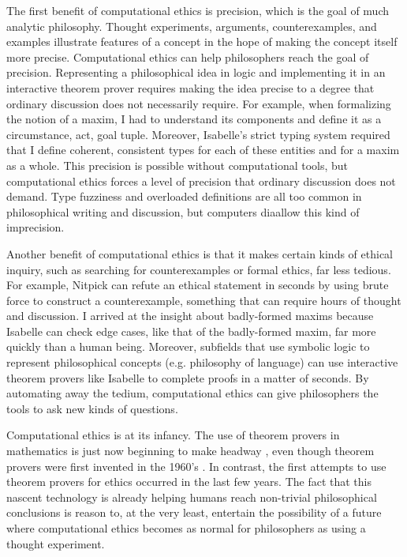 \begin{isabellebody}
\begin{isamarkuptext}
The first benefit of computational ethics is precision, which is the goal of much analytic
philosophy. Thought experiments, arguments, counterexamples, and examples 
illustrate features of a concept in the hope of making the concept itself more precise. Computational 
ethics can help philosophers reach the goal of precision. Representing a philosophical idea in logic 
and implementing it in an interactive theorem prover requires making the idea precise to a degree 
that ordinary discussion does not necessarily require. For example, when formalizing the notion of a 
maxim, I had to understand its components and define it as a circumstance, act, goal tuple. Moreover, 
Isabelle's strict typing system required that I define coherent, consistent types for each of these 
entities and for a maxim as a whole. This precision is possible without computational tools, but 
computational ethics forces a level of precision that ordinary discussion does not demand. Type 
fuzziness and overloaded definitions are all too common in philosophical writing and 
discussion, but computers diaallow this kind of imprecision.

Another benefit of computational ethics is that it makes certain kinds of ethical inquiry, such as 
searching for counterexamples or formal ethics, far less tedious. For example, Nitpick can refute 
an ethical statement in seconds by using brute force to construct a counterexample, something that can require hours
of thought and discussion. I arrived at the insight about badly-formed maxims because Isabelle 
can check edge cases, like that of the badly-formed maxim, far more quickly than a human being. Moreover, 
subfields that use symbolic logic to represent philosophical concepts (e.g. philosophy of language) can 
use interactive theorem provers like Isabelle to complete proofs in a matter of seconds. By automating 
away the tedium, computational ethics can give philosophers the tools to ask new kinds of questions.

Computational ethics is at its infancy. The use of theorem provers in mathematics is just now beginning 
to make headway \citep{buzzardvideo}, even though theorem provers were first invented in the 1960's \citep{historyofITP}. 
In contrast, the first attempts to use theorem provers for ethics occurred in the last few years. The 
fact that this nascent technology is already helping humans reach non-trivial philosophical conclusions 
is reason to, at the very least, entertain the possibility of a future where computational ethics 
becomes as normal for philosophers as using a thought experiment.


\end{isamarkuptext}
\end{isabellebody}

